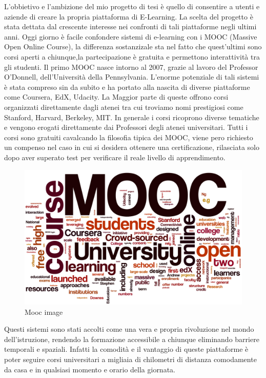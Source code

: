 L'obbietivo e l'ambizione del mio progetto di tesi è quello di consentire a utenti e aziende di creare la propria piattaforma di E-Learning.
La scelta del progetto è stata dettata dal crescente interesse nei confronti di tali piattaforme negli ultimi anni.
Oggi giorno è facile confondere sistemi di e-learning con i MOOC (Massive Open Online Course), la differenza sostanzizale sta nel fatto che quest'ultimi sono corsi aperti a chiunque,la partecipazione è gratuita e permettono interattività tra gli studenti.
Il primo MOOC nasce intorno al 2007, grazie al lavoro del Professor O’Donnell, dell'Università della Pennsylvania.
L'enorme potenziale di tali sistemi è stata compreso sin da subito e ha portato alla nascita di diverse piattaforme come Coursera, EdX, Udacity.
La Maggior parte di queste offrono corsi organizzati direttamente dagli atenei tra cui troviamo nomi prestigiosi come Stanford, Harvard, Berkeley, MIT. In generale i corsi ricoprono diverse tematiche e vengono erogati direttamente dai Professori degli atenei universitari.
Tutti i corsi sono gratuiti cavalcando la filosofia tipica dei MOOC, viene pero richiesto un compenso nel caso in cui si desidera ottenere una certificazione, rilasciata solo dopo aver superato test per verificare il reale livello di apprendimento.

\begin{figure}[htb] %
 \centering
 \includegraphics[width=0.8\linewidth]{images/introduction/mooc.png}\hfill
 \caption[Mooc image]{Mooc image}
 \label{fig:fourV}
\end{figure}

Questi sistemi sono stati accolti come una vera e propria rivoluzione nel mondo dell'istruzione, rendendo la formazione accessibile a chiunque eliminando barriere temporali e spaziali. Infatti la comodità e il vantaggio di queste piattaforme è poter seguire corsi universitari a migliaia di chilometri di distanza comodamente da casa e in qualsiasi momento e orario della giornata.

